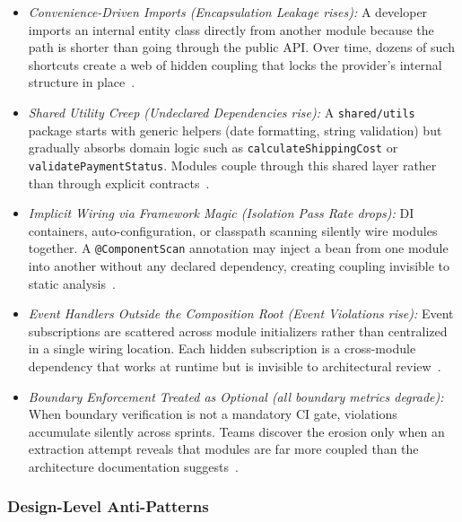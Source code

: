 \begin{itemize}[itemsep=8pt,topsep=2pt]
  \item \emph{Convenience-Driven Imports (Encapsulation Leakage rises):}
  A developer imports an internal entity class directly from another module because the path is shorter than going through the public API. Over time, dozens of such shortcuts create a web of hidden coupling that locks the provider's internal structure in place~\cite{parnas1972informationhiding,khononov2024balancing}.

  \item \emph{Shared Utility Creep (Undeclared Dependencies rise):}
  A \texttt{shared/utils} package starts with generic helpers (date formatting, string validation) but gradually absorbs domain logic such as \texttt{calculateShippingCost} or \texttt{validatePaymentStatus}. Modules couple through this shared layer rather than through explicit contracts~\cite{martin2012clean}.

  \item \emph{Implicit Wiring via Framework Magic (Isolation Pass Rate drops):}
  DI containers, auto-configuration, or classpath scanning silently wire modules together. A \texttt{@ComponentScan} annotation may inject a bean from one module into another without any declared dependency, creating coupling invisible to static analysis~\cite{rocha2021catalogingDI}.

  \item \emph{Event Handlers Outside the Composition Root (Event Violations rise):}
  Event subscriptions are scattered across module initializers rather than centralized in a single wiring location. Each hidden subscription is a cross-module dependency that works at runtime but is invisible to architectural review~\cite{richardson2018microservices}.

  \item \emph{Boundary Enforcement Treated as Optional (all boundary metrics degrade):}
  When boundary verification is not a mandatory CI gate, violations accumulate silently across sprints. Teams discover the erosion only when an extraction attempt reveals that modules are far more coupled than the architecture documentation suggests~\cite{thoughtworks2017fitnessfunction}.
\end{itemize}

\subsubsection*{Design-Level Anti-Patterns}

